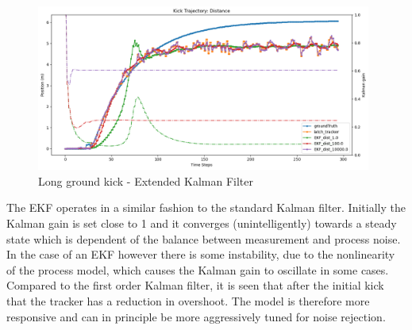 \documentclass[a4paper,twoside,12pt]{report}
\begin{document}
\begin{figure}[h!]
\begin{center}
\includegraphics[width=11cm]{images/ekf_ground_long.png}
\caption{Long ground kick - Extended Kalman Filter}
\label{fig:ekfgroundlong}
\end{center}
\end{figure}



The EKF operates in a similar fashion to the standard Kalman filter. Initially the Kalman gain is set close to 1 and it converges (unintelligently) towards a steady state which is dependent of the balance between measurement and process noise. In the case of an EKF however there is some instability, due to the nonlinearity of the process model, which causes the Kalman gain to oscillate in some cases. Compared to the first order Kalman filter, it is seen that after the initial kick that the tracker has a reduction in overshoot. The model is therefore more responsive and can in principle be more aggressively tuned for noise rejection.
\end{document}
